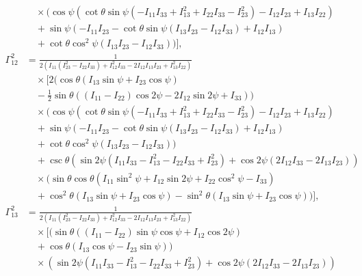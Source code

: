 \documentclass[pdflatex,sn-mathphys-num]{sn-jnl}%
\theoremstyle{thmstyleone}%
\theoremstyle{thmstyletwo}%
\theoremstyle{thmstylethree}%
\begin{document}
\begin{appendices}
\begin{align}
    &\quad \times \bigg(\cos \psi \left(\cot \theta \sin \psi \left(-I_{11} I_{33}+I_{13}^2+I_{22} I_{33}-I_{23}^2\right)-I_{12} I_{23}+I_{13} I_{22}\right) \nonumber \\
    &\quad +\sin \psi (-I_{11} I_{23}-\cot \theta \sin \psi (I_{13} I_{23}-I_{12} I_{33})+I_{12} I_{13}) \nonumber \\
    &\quad +\cot \theta \cos ^2\psi (I_{13} I_{23}-I_{12} I_{33})\bigg) \bigg], \nonumber \\
    \Gamma^{2}_{12} &= \frac{1}{2 \left(I_{11} \left(I_{23}^2-I_{22} I_{33}\right)+I_{12}^2 I_{33}-2 I_{12} I_{13} I_{23}+I_{13}^2 I_{22}\right)} \nonumber \\
    &\quad \times \bigg[ 2 \bigg(\cos \theta (I_{13} \sin \psi+I_{23} \cos \psi) \nonumber \\
    &\quad -\frac{1}{2} \sin \theta ((I_{11}-I_{22}) \cos 2\psi-2 I_{12} \sin 2\psi+I_{33})\bigg) \nonumber \\
    &\quad \times \bigg(\cos \psi \left(\cot \theta \sin \psi \left(-I_{11} I_{33}+I_{13}^2+I_{22} I_{33}-I_{23}^2\right)-I_{12} I_{23}+I_{13} I_{22}\right) \nonumber \\
    &\quad +\sin \psi (-I_{11} I_{23}-\cot \theta \sin \psi (I_{13} I_{23}-I_{12} I_{33})+I_{12} I_{13}) \nonumber \\
    &\quad +\cot \theta \cos ^2\psi (I_{13} I_{23}-I_{12} I_{33})\bigg) \nonumber \\
    &\quad +\csc \theta \left(\sin 2\psi \left(I_{11} I_{33}-I_{13}^2-I_{22} I_{33}+I_{23}^2\right)+\cos 2\psi (2 I_{12} I_{33}-2 I_{13} I_{23})\right) \nonumber \\
    &\quad \times \bigg(\sin \theta \cos \theta \left(I_{11} \sin ^2\psi+I_{12} \sin 2\psi+I_{22} \cos ^2\psi-I_{33}\right) \nonumber \\
    &\quad +\cos ^2\theta (I_{13} \sin \psi+I_{23} \cos \psi)-\sin ^2\theta (I_{13} \sin \psi+I_{23} \cos \psi)\bigg) \bigg], \nonumber \\
    \Gamma^{2}_{13} &= \frac{1}{2 \left(I_{11} \left(I_{23}^2-I_{22} I_{33}\right)+I_{12}^2 I_{33}-2 I_{12} I_{13} I_{23}+I_{13}^2 I_{22}\right)} \nonumber \\
    &\quad \times \bigg[ (\sin \theta ((I_{11}-I_{22}) \sin \psi \cos \psi+I_{12} \cos 2\psi) \nonumber \\
    &\quad +\cos \theta (I_{13} \cos \psi-I_{23} \sin \psi)) \nonumber \\
    &\quad \times \left(\sin 2\psi \left(I_{11} I_{33}-I_{13}^2-I_{22} I_{33}+I_{23}^2\right)+\cos 2\psi (2 I_{12} I_{33}-2 I_{13} I_{23})\right) \nonumber \\

\end{align}
\end{appendices}
\end{document}
